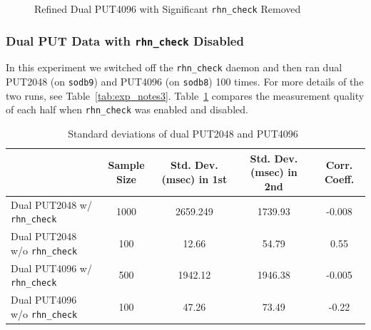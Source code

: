 \documentclass[10pt]{article}
\begin{document}
\begin{figure}[h]
{		\label{fig:fo_refined_dual_put4096_new_trimmed}
	}
	\caption{Refined Dual PUT4096 with Significant {\tt rhn\_check} Removed~\label{fig:new_put4096}}
\end{figure}

\clearpage
\newpage

\subsubsection{Dual PUT Data with {\tt rhn\_check} Disabled}
In this experiment we switched off the {\tt rhn\_check} daemon and then ran dual PUT2048 (on {\tt sodb9}) and PUT4096 (on {\tt sodb8}) 100 times.
For more details of the two runs, see Table~\ref{tab:exp_notes3}. 
Table~\ref{tab:rhn_effect_comp} compares the measurement quality of 
each half when {\tt rhn\_check} was enabled and disabled. 


\begin{table}[h]
\centering
{
 \begin{tabular}{|l|c|c|c|c|} \hline
  														& Sample Size & Std. Dev. (msec) in 1st & Std. Dev. (msec) in 2nd & Corr. Coeff.\\ \hline
Dual PUT2048 w/ {\tt rhn\_check} &  1000 & 2659.249 & 1739.93 &  -0.008\\ \hline
Dual PUT2048 w/o {\tt rhn\_check} &  100  & 12.66 & 54.79 & 0.55 \\ \hline
Dual PUT4096 w/ {\tt rhn\_check} &  500  & 1942.12 & 1946.38 & -0.005\\ \hline
Dual PUT4096 w/o {\tt rhn\_check} &  100  & 47.26 &  73.49 & -0.22\\ \hline
  \end{tabular}
  }
 \caption{Standard deviations of dual PUT2048 and PUT4096~\label{tab:rhn_effect_comp}}
\end{table}
\end{document}
